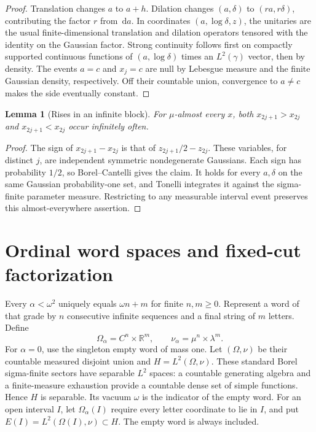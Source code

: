 \documentclass[11pt]{article}
\newtheorem{lemma}[theorem]{Lemma}
\theoremstyle{remark}\newtheorem{remark}[theorem]{Remark}
\newcommand{\R}{\mathbb R}\newcommand{\N}{\mathbb N}
\newcommand{\Om}{\Omega}\newcommand{\dd}{\,\mathrm d}
\newcommand{\vac}{\omega}\newcommand{\fp}{\mathbin{\circledast}}
\begin{document}
\begin{proof}
Translation changes $a$ to $a+h$. Dilation changes $(a,\delta)$ to
$(ra,r\delta)$, contributing the factor $r$ from $\dd a$. In coordinates
$(a,\log\delta,z)$, the unitaries are the usual finite-dimensional translation
and dilation operators tensored with the identity on the Gaussian factor.
Strong continuity follows first on compactly supported continuous functions
of $(a,\log\delta)$ times an $L^2(\gamma)$ vector, then by density. The
events $a=c$ and $x_j=c$ are null by Lebesgue measure and the finite Gaussian
density, respectively. Off their countable union, convergence to $a\ne c$
makes the side eventually constant.
\end{proof}

\begin{lemma}[Rises in an infinite block]\label{lem:rises}
For $\mu$-almost every $x$, both $x_{2j+1}>x_{2j}$ and
$x_{2j+1}<x_{2j}$ occur infinitely often.
\end{lemma}

\begin{proof}
The sign of $x_{2j+1}-x_{2j}$ is that of $z_{2j+1}/2-z_{2j}$.
These variables, for distinct $j$, are independent symmetric nondegenerate
Gaussians. Each sign has probability $1/2$, so Borel--Cantelli gives the claim.
It holds for every $a,\delta$ on the same Gaussian probability-one set, and
Tonelli integrates it against the sigma-finite parameter measure. Restricting
to any measurable interval event preserves this almost-everywhere assertion.
\end{proof}

\section{Ordinal word spaces and fixed-cut factorization}\label{sec:words}

Every $\alpha<\omega^2$ uniquely equals $\omega n+m$ for finite $n,m\geq0$.
Represent a word of that grade by $n$ consecutive infinite sequences and a
final string of $m$ letters. Define
\[
 \Om_\alpha=C^n\times\R^m,\qquad
 \nu_\alpha=\mu^n\times\lambda^m.
\]
For $\alpha=0$, use the singleton empty word of mass one. Let $(\Om,\nu)$
be their countable measured disjoint union and $H=L^2(\Om,\nu)$. These
standard Borel sigma-finite sectors have separable $L^2$ spaces: a countable
generating algebra and a finite-measure exhaustion provide a countable dense
set of simple functions. Hence $H$ is separable. Its vacuum $\vac$ is the
indicator of the empty word. For an open interval $I$, let $\Om_\alpha(I)$
require every letter coordinate to lie in $I$, and put
$E(I)=L^2(\Om(I),\nu)\subset H$. The empty word is always included.
\end{document}
